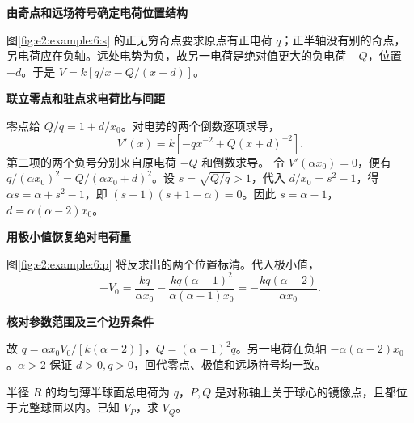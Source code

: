 \begin{solution}\textbf{由奇点和远场符号确定电荷位置结构}\par\nobreak
图\ref{fig:e2:example:6:s} 的正无穷奇点要求原点有正电荷 $q$；正半轴没有别的奇点，另电荷应在负轴。远处电势为负，故另一电荷是绝对值更大的负电荷 $-Q$，位置 $-d$。于是 $V=k[q/x-Q/(x+d)]$。



\par\medskip{}\noindent\textbf{联立零点和驻点求电荷比与间距}\par\nobreak
零点给 $Q/q=1+d/x_0$。对电势的两个倒数逐项求导，
\[
 V'(x)=k\left[-qx^{-2}+Q(x+d)^{-2}\right].
\]
第二项的两个负号分别来自原电荷 $-Q$ 和倒数求导。
令 $V'(\alpha x_0)=0$，便有
$q/(\alpha x_0)^2=Q/(\alpha x_0+d)^2$。设 $s=\sqrt{Q/q}>1$，代入 $d/x_0=s^2-1$，得 $\alpha s=\alpha+s^2-1$，即 $(s-1)(s+1-\alpha)=0$。因此 $s=\alpha-1$，$d=\alpha(\alpha-2)x_0$。



\par\medskip{}\noindent\textbf{用极小值恢复绝对电荷量}\par\nobreak
图\ref{fig:e2:example:6:p} 将反求出的两个位置标清。代入极小值，
\[
 -V_0=\frac{kq}{\alpha x_0}
 -\frac{kq(\alpha-1)^2}{\alpha(\alpha-1)x_0}
 =-\frac{kq(\alpha-2)}{\alpha x_0}.
\]


\par\medskip{}\noindent\textbf{核对参数范围及三个边界条件}\par\nobreak
故 $q=\alpha x_0V_0/[k(\alpha-2)]$，$Q=(\alpha-1)^2q$。另一电荷在负轴 $-\alpha(\alpha-2)x_0$。$\alpha>2$ 保证 $d>0,q>0$，回代零点、极值和远场符号均一致。\end{solution}
\begin{question}\begin{example}[半球面在镜像点的电势关系]\label{e2:example:7}
半径 $R$ 的均匀薄半球面总电荷为 $q$，$P,Q$ 是对称轴上关于球心的镜像点，且都位于完整球面以内。已知 $V_P$，求 $V_Q$。
\end{example}
\end{question}
